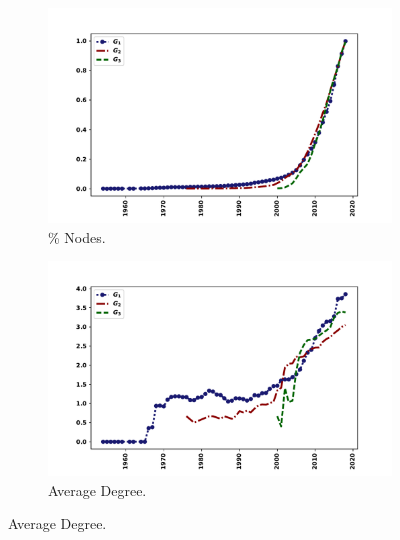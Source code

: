 \documentclass{article}
\theoremstyle{definition}
\begin{document}
\begin{figure}[!hbtp]
    \centering
    \begin{subfigure}{.45\textwidth}\centering
        \includegraphics[width=1.1\textwidth]{./assets/images/percentage_networks_nodes.pdf}
        \caption{\% Nodes.}\label{fig:normalised_number_nodes}
    \end{subfigure}
    \begin{subfigure}{.45\textwidth}\centering
        \includegraphics[width=1.1\textwidth]{./assets/images/degrees_over_time.pdf}
        \caption{Average Degree.}\label{fig:average_degree}
     \end{subfigure}


\end{figure}
\end{document}
